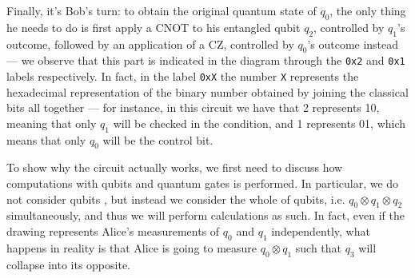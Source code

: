 \documentclass[a4paper, 12pt]{report}
\begin{document}
Finally, it's Bob's turn: to obtain the original quantum state of $q_0$, the only thing he needs to do is first apply a CNOT to his entangled qubit $q_2$, controlled by $q_1$'s outcome, followed by an application of a CZ, controlled by $q_0$'s outcome instead --- we observe that this part is indicated in the diagram through the \texttt{0x2} and \texttt{0x1} labels respectively. In fact, in the label \texttt{0xX} the number \texttt X represents the hexadecimal representation of the binary number obtained by joining the classical bits all together --- for instance, in this circuit we have that 2 represents 10, meaning that only $q_1$ will be checked in the condition, and 1 represents 01, which means that only $q_0$ will be the control bit.

To show why the circuit actually works, we first need to discuss how computations with qubits and quantum gates is performed. In particular, we do not consider qubits , but instead we consider the whole  of qubits, i.e. $q_0 \otimes q_1 \otimes q_2$ simultaneously, and thus we will perform calculations as such. In fact, even if the drawing represents Alice's measurements of $q_0$ and $q_1$ independently, what happens in reality is that Alice is going to measure $q_0 \otimes q_1$ such that $q_3$ will collapse into its opposite.
\end{document}
